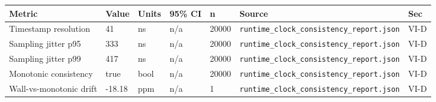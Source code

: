 \begin{tabular}{lllllll}
\hline
Metric & Value & Units & 95\% CI & n & Source & Sec \\
\hline
Timestamp resolution & 41 & ns & n/a & 20000 & \texttt{runtime_clock_consistency_report.json} & VI-D \\
Sampling jitter p95 & 333 & ns & n/a & 20000 & \texttt{runtime_clock_consistency_report.json} & VI-D \\
Sampling jitter p99 & 417 & ns & n/a & 20000 & \texttt{runtime_clock_consistency_report.json} & VI-D \\
Monotonic consistency & true & bool & n/a & 20000 & \texttt{runtime_clock_consistency_report.json} & VI-D \\
Wall-vs-monotonic drift & -18.18 & ppm & n/a & 1 & \texttt{runtime_clock_consistency_report.json} & VI-D \\
\hline
\end{tabular}
